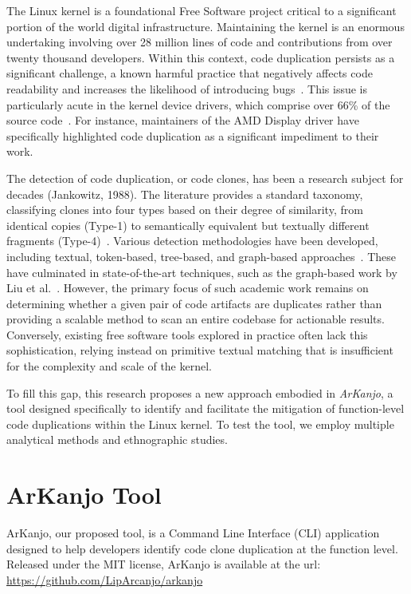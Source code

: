 \documentclass[conference]{IEEEtran}
\begin{document}
The Linux kernel is a foundational Free Software project 
critical to a significant portion of the world digital infrastructure. Maintaining 
the kernel is an enormous undertaking involving over 28 million lines of code 
and contributions from over twenty thousand developers. Within this context, code 
duplication persists as a significant challenge, a known harmful practice that 
negatively affects code readability and increases the likelihood of introducing
bugs~\cite{harmone,harmtwo}. This issue is particularly acute in the 
kernel device drivers, which comprise over 66\% of the source code~\cite{marcelo}. 
For instance, maintainers of the AMD Display driver have specifically highlighted code 
duplication as a significant impediment to their work.

The detection of code duplication, or code clones, has been a research subject for 
decades (Jankowitz, 1988). The literature provides a standard taxonomy, classifying 
clones into four types based on their degree of similarity, from identical copies 
(Type-1) to semantically equivalent but textually different fragments (Type-4)~\cite{litreview}. 
Various detection methodologies have been developed, including textual, token-based, 
tree-based, and graph-based approaches~\cite{litreview}. These have culminated in 
state-of-the-art techniques, such as the graph-based work by Liu et al.~\cite{tailor}. 	
However, the primary focus of such academic work remains on determining whether a given 
pair of code artifacts are duplicates rather than providing a scalable method to scan 
an entire codebase for actionable results. Conversely, existing free software tools explored 
in practice often lack this sophistication, relying instead on primitive textual matching 
that is insufficient for the complexity and scale of the kernel.

To fill this gap, this research proposes a new approach embodied in \textit{ArKanjo}, a tool 
designed specifically to identify and facilitate the mitigation of function-level code 
duplications within the Linux kernel. To test the tool, we employ multiple analytical 
methods and ethnographic studies.


\section{ArKanjo Tool}

ArKanjo, our proposed tool, is a Command Line Interface (CLI) application designed to
help developers identify code clone duplication at the function level. Released under the
MIT license, ArKanjo is available at the url: \url{https://github.com/LipArcanjo/arkanjo}
\end{document}

